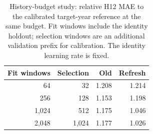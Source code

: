 \begin{table}[t]
\centering
\caption{History-budget study: relative H12 MAE to the calibrated target-year reference at the same budget. Fit windows include the identity holdout; selection windows are an additional validation prefix for calibration. The identity learning rate is fixed.}
\label{tab:budget}
\begin{tabular}{rrrr}
\toprule
Fit windows & Selection & Old & Refresh \\
\midrule
64 & 32 & 1.208 & 1.214 \\
256 & 128 & 1.153 & 1.198 \\
1,024 & 512 & 1.175 & 1.046 \\
2,048 & 1,024 & 1.177 & 1.026 \\
\bottomrule
\end{tabular}
\end{table}
